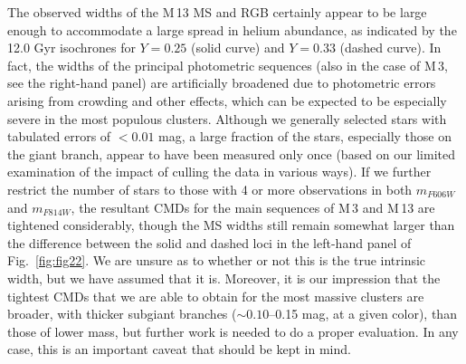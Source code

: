 \documentclass[12pt,preprint]{aastex}
\begin{document}
The observed widths of the M$\,$13 MS and RGB certainly appear to be large
enough to accommodate a large spread in helium abundance, as indicated by the
12.0 Gyr isochrones for $Y = 0.25$ (solid curve) and $Y = 0.33$ (dashed curve).
In fact, the widths of the principal photometric sequences (also in the case of
M$\,$3, see the right-hand panel) are artificially broadened due to photometric
errors arising from crowding and other effects, which can be expected to be
especially severe in the most populous clusters.  Although we generally selected
stars with tabulated errors of $< 0.01$ mag, a large fraction of the stars,
especially those on the giant branch, appear to have been measured only once
(based on our limited examination of the impact of culling the data in various
ways).  If we further restrict the number of stars to those with 4 or more
observations in both $m_{F606W}$ and $m_{F814W}$, the resultant CMDs for the
main sequences of M$\,$3 and M$\,$13 are tightened considerably, though the MS
widths still remain somewhat larger than the difference between the solid and
dashed loci in the left-hand panel of Fig.~\ref{fig:fig22}.  We are unsure as
to whether or not this is the true intrinsic width, but we have assumed that it
is.  Moreover, it is our impression that the tightest CMDs that we are able to
obtain for the most massive clusters are broader, with thicker subgiant
branches ($\sim 0.10$--0.15 mag, at a given color), than those of lower mass,
but further work is needed to do a proper evaluation.  In any case, this is an
important caveat that should be kept in mind.
\end{document}
